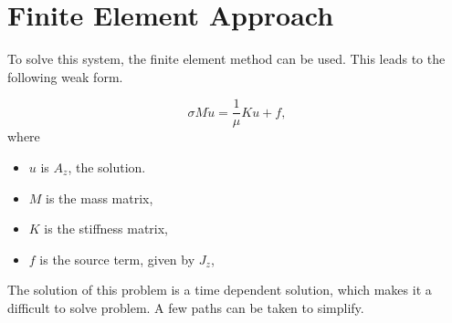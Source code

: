 \newpage
\section{Finite Element Approach}
To solve this system, the finite element method can be used. This leads to the following weak form.
\begin{weakform}
    \begin{equation*}
        \sigma M \dot u = \frac{1}{\mu}K u + f,
    \end{equation*}
    where
    \begin{itemize}
        \item $u$ is $A_z$, the solution.
        \item $M$ is the mass matrix,
        \item $K$ is the stiffness matrix,
        \item $f$ is the source term, given by $J_z$,
    \end{itemize}
\end{weakform}
The solution of this problem is a time dependent solution, which makes it a difficult to solve problem. A few paths can be taken to simplify.